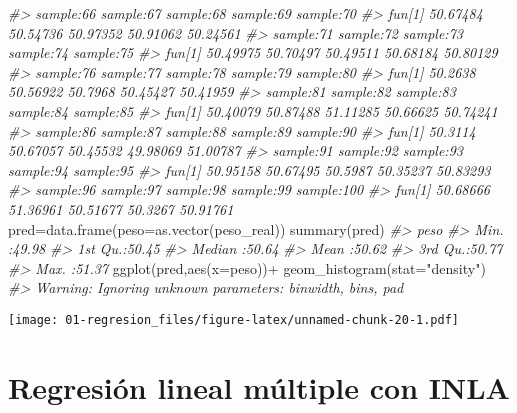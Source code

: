 \documentclass[
]{book}
\newenvironment{Shaded}{\begin{snugshade}}{\end{snugshade}}
\newcommand{\AttributeTok}[1]{\textcolor[rgb]{0.77,0.63,0.00}{#1}}
\newcommand{\CommentTok}[1]{\textcolor[rgb]{0.56,0.35,0.01}{\textit{#1}}}
\newcommand{\FunctionTok}[1]{\textcolor[rgb]{0.00,0.00,0.00}{#1}}
\newcommand{\NormalTok}[1]{#1}
\newcommand{\OtherTok}[1]{\textcolor[rgb]{0.56,0.35,0.01}{#1}}
\newcommand{\SpecialCharTok}[1]{\textcolor[rgb]{0.00,0.00,0.00}{#1}}
\newcommand{\StringTok}[1]{\textcolor[rgb]{0.31,0.60,0.02}{#1}}
\begin{document}
\begin{Shaded}
\begin{Highlighting}[]
\CommentTok{\#\textgreater{}        sample:66 sample:67 sample:68 sample:69 sample:70}
\CommentTok{\#\textgreater{} fun[1]  50.67484  50.54736  50.97352  50.91062  50.24561}
\CommentTok{\#\textgreater{}        sample:71 sample:72 sample:73 sample:74 sample:75}
\CommentTok{\#\textgreater{} fun[1]  50.49975  50.70497  50.49511  50.68184  50.80129}
\CommentTok{\#\textgreater{}        sample:76 sample:77 sample:78 sample:79 sample:80}
\CommentTok{\#\textgreater{} fun[1]   50.2638  50.56922   50.7968  50.45427  50.41959}
\CommentTok{\#\textgreater{}        sample:81 sample:82 sample:83 sample:84 sample:85}
\CommentTok{\#\textgreater{} fun[1]  50.40079  50.87488  51.11285  50.66625  50.74241}
\CommentTok{\#\textgreater{}        sample:86 sample:87 sample:88 sample:89 sample:90}
\CommentTok{\#\textgreater{} fun[1]   50.3114  50.67057  50.45532  49.98069  51.00787}
\CommentTok{\#\textgreater{}        sample:91 sample:92 sample:93 sample:94 sample:95}
\CommentTok{\#\textgreater{} fun[1]  50.95158  50.67495   50.5987  50.35237  50.83293}
\CommentTok{\#\textgreater{}        sample:96 sample:97 sample:98 sample:99 sample:100}
\CommentTok{\#\textgreater{} fun[1]  50.68666  51.36961  50.51677   50.3267   50.91761}
\NormalTok{pred}\OtherTok{=}\FunctionTok{data.frame}\NormalTok{(}\AttributeTok{peso=}\FunctionTok{as.vector}\NormalTok{(peso\_real))}
\FunctionTok{summary}\NormalTok{(pred)}
\CommentTok{\#\textgreater{}       peso      }
\CommentTok{\#\textgreater{}  Min.   :49.98  }
\CommentTok{\#\textgreater{}  1st Qu.:50.45  }
\CommentTok{\#\textgreater{}  Median :50.64  }
\CommentTok{\#\textgreater{}  Mean   :50.62  }
\CommentTok{\#\textgreater{}  3rd Qu.:50.77  }
\CommentTok{\#\textgreater{}  Max.   :51.37}
\FunctionTok{ggplot}\NormalTok{(pred,}\FunctionTok{aes}\NormalTok{(}\AttributeTok{x=}\NormalTok{peso))}\SpecialCharTok{+}
  \FunctionTok{geom\_histogram}\NormalTok{(}\AttributeTok{stat=}\StringTok{"density"}\NormalTok{)}
\CommentTok{\#\textgreater{} Warning: Ignoring unknown parameters: binwidth, bins, pad}
\end{Highlighting}
\end{Shaded}

\texttt{[image: 01-regresion\_files/figure-latex/unnamed-chunk-20-1.pdf]}

\hypertarget{regresiuxf3n-lineal-muxfaltiple-con-inla}{%
\section{Regresión lineal múltiple con INLA}\label{regresiuxf3n-lineal-muxfaltiple-con-inla}}
\end{document}
